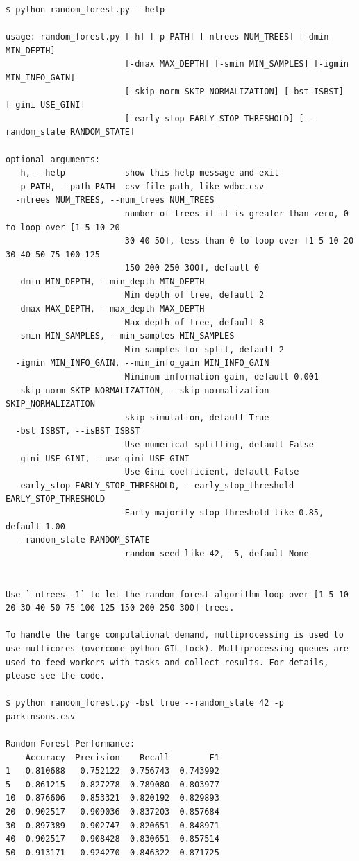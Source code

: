 \begin{verbatim}
$ python random_forest.py --help

usage: random_forest.py [-h] [-p PATH] [-ntrees NUM_TREES] [-dmin MIN_DEPTH]
                        [-dmax MAX_DEPTH] [-smin MIN_SAMPLES] [-igmin MIN_INFO_GAIN]
                        [-skip_norm SKIP_NORMALIZATION] [-bst ISBST] [-gini USE_GINI]
                        [-early_stop EARLY_STOP_THRESHOLD] [--random_state RANDOM_STATE]

optional arguments:
  -h, --help            show this help message and exit
  -p PATH, --path PATH  csv file path, like wdbc.csv
  -ntrees NUM_TREES, --num_trees NUM_TREES
                        number of trees if it is greater than zero, 0 to loop over [1 5 10 20
                        30 40 50], less than 0 to loop over [1 5 10 20 30 40 50 75 100 125
                        150 200 250 300], default 0
  -dmin MIN_DEPTH, --min_depth MIN_DEPTH
                        Min depth of tree, default 2
  -dmax MAX_DEPTH, --max_depth MAX_DEPTH
                        Max depth of tree, default 8
  -smin MIN_SAMPLES, --min_samples MIN_SAMPLES
                        Min samples for split, default 2
  -igmin MIN_INFO_GAIN, --min_info_gain MIN_INFO_GAIN
                        Minimum information gain, default 0.001
  -skip_norm SKIP_NORMALIZATION, --skip_normalization SKIP_NORMALIZATION
                        skip simulation, default True
  -bst ISBST, --isBST ISBST
                        Use numerical splitting, default False
  -gini USE_GINI, --use_gini USE_GINI
                        Use Gini coefficient, default False
  -early_stop EARLY_STOP_THRESHOLD, --early_stop_threshold EARLY_STOP_THRESHOLD
                        Early majority stop threshold like 0.85, default 1.00
  --random_state RANDOM_STATE
                        random seed like 42, -5, default None


Use `-ntrees -1` to let the random forest algorithm loop over [1 5 10 20 30 40 50 75 100 125 150 200 250 300] trees.  

To handle the large computational demand, multiprocessing is used to use multicores (overcome python GIL lock). Multiprocessing queues are used to feed workers with tasks and collect results. For details, please see the code.  

$ python random_forest.py -bst true --random_state 42 -p parkinsons.csv

Random Forest Performance: 
    Accuracy  Precision    Recall        F1
1   0.810688   0.752122  0.756743  0.743992
5   0.861215   0.827278  0.789080  0.803977
10  0.876606   0.853321  0.820192  0.829893
20  0.902517   0.909036  0.837203  0.857684
30  0.897389   0.902747  0.820651  0.848971
40  0.902517   0.908428  0.830651  0.857514
50  0.913171   0.924270  0.846322  0.871725


\end{verbatim}
